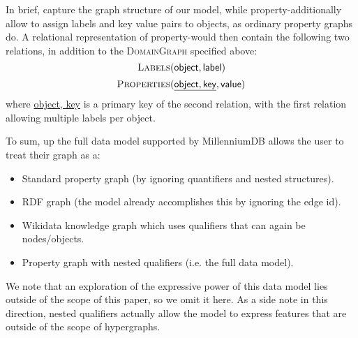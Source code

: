 In brief, \data capture the graph structure of our model, while property-\data additionally allow to assign labels and key value pairs to objects, as ordinary property graphs do.
A relational representation of property-\data would then contain the following two relations, in addition to the \textsc{DomainGraph} specified above:
\[\textsc{Labels}(\textsf{object},\textsf{label})\]
\[\textsc{Properties}(\underline{\textsf{object},\textsf{key}},\textsf{value})\]
where \underline{\textsf{object, key}} is a primary key of the second relation, with the first relation allowing multiple labels per object. 

To sum, up the full data model supported by MillenniumDB allows the user to treat their graph as a:
\begin{itemize}
\item Standard property graph (by ignoring quantifiers and nested structures).
\item RDF graph (the \data model already accomplishes this by ignoring the edge id).
\item Wikidata \cite{VrandecicK14} knowledge graph which uses qualifiers that can again be nodes/objects.
\item Property graph with nested qualifiers (i.e. the full data model).
\end{itemize} 

We note that an exploration of the expressive power of this data model lies outside of the scope of this paper, so we omit it here. 
As a side note in this direction, nested qualifiers actually allow the \data model to express features that are outside of the scope of hypergraphs.